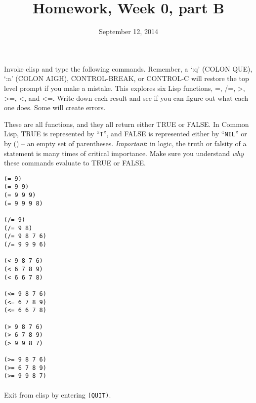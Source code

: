 \documentclass{article}
\title{Homework, Week 0, part B}
\date{September 12, 2014}
\begin{document}
\maketitle{}
\lstset{language=Lisp}

Invoke clisp and type the following commands. Remember, a `:q' (COLON QUE), `:a' (COLON AIGH), CONTROL-BREAK, or CONTROL-C will restore the top level prompt if you make a mistake. This explores six Lisp functions, =, /=, \textgreater, \textgreater=, \textless, and \textless=. Write down each result and see if you can figure out what each one does. Some will create errors.

These are all functions, and they all return either TRUE or FALSE. In Common Lisp, TRUE is represented by ``\texttt{T}'', and FALSE is represented either by ``\texttt{NIL}'' or by () -- an empty set of parentheses. \textit{Important}: in logic, the truth or falsity of a statement is many times of critical importance. Make sure you understand \textit{why} these commands evaluate to TRUE or FALSE.


\begin{multicols}{2}
\begin{lstlisting}
(= 9)
(= 9 9)
(= 9 9 9)
(= 9 9 9 8)

(/= 9)
(/= 9 8)
(/= 9 8 7 6)
(/= 9 9 9 6)

(< 9 8 7 6)
(< 6 7 8 9)
(< 6 6 7 8)

(<= 9 8 7 6)
(<= 6 7 8 9)
(<= 6 6 7 8)

(> 9 8 7 6)
(> 6 7 8 9)
(> 9 9 8 7)

(>= 9 8 7 6)
(>= 6 7 8 9)
(>= 9 9 8 7)
\end{lstlisting}
\end{multicols}

\paragraph{} Exit from clisp by entering \texttt{(QUIT)}.
\end{document}
